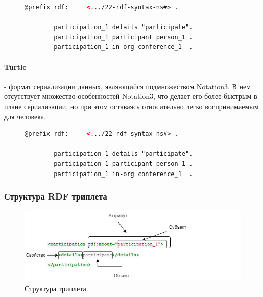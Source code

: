 \documentclass[12pt]{article}
\begin{document}
\begin{figure}[!ht]
    \begin{lstlisting}[language=XML]
        @prefix rdf:     <.../22-rdf-syntax-ns#> .

        participation_1 details "participate".
        participation_1 participant person_1 .
        participation_1 in-org conference_1  .
    \end{lstlisting}
\end{figure}

\paragraph{Turtle} - формат сериализации данных, являющийся подмножеством Notation3. В нем отсутствует множество особенностей Notation3, что делает его более быстрым в плане сериализации, но при этом оставаясь относительно легко воспринимаемым для человека.

\begin{figure}[!ht]
    \begin{lstlisting}[language=XML]
        @prefix rdf:     <.../22-rdf-syntax-ns#> .

        participation_1 details "participate".
        participation_1 participant person_1 .
        participation_1 in-org conference_1  .
    \end{lstlisting}
\end{figure}

\subsubsection{Структура RDF триплета}
\hphantom{text}
\begin{figure}[!ht]
    \includegraphics[width=1\textwidth]{_images/rdf_eric_razbor.png}
    \caption{Структура триплета}
    \label{fig:rdf_deconstruction}
\end{figure}
\end{document}

